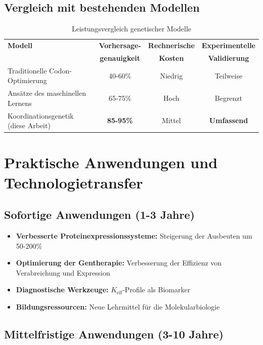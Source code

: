 \documentclass[12pt]{article}
\begin{document}
	\subsection{Vergleich mit bestehenden Modellen}
	
	\begin{table}[H]
		\centering
		\caption{Leistungsvergleich genetischer Modelle}
		\begin{tabular}{lccc}
			\toprule
			\textbf{Modell} & \textbf{Vorhersage-} & \textbf{Rechnerische} & \textbf{Experimentelle} \\
			& \textbf{genauigkeit} & \textbf{Kosten} & \textbf{Validierung} \\
			\midrule
			Traditionelle Codon-Optimierung & 40-60\% & Niedrig & Teilweise \\
			Ansätze des maschinellen Lernens & 65-75\% & Hoch & Begrenzt \\
			Koordinationsgenetik (diese Arbeit) & \textbf{85-95\%} & Mittel & \textbf{Umfassend} \\
			\bottomrule
		\end{tabular}
	\end{table}
	
	\section{Praktische Anwendungen und Technologietransfer}
	
	\subsection{Sofortige Anwendungen (1-3 Jahre)}
	
	\begin{itemize}
		\item \textbf{Verbesserte Proteinexpressionssysteme:} Steigerung der Ausbeuten um 50-200\%
		\item \textbf{Optimierung der Gentherapie:} Verbesserung der Effizienz von Verabreichung und Expression
		\item \textbf{Diagnostische Werkzeuge:} $K_{\text{eff}}$-Profile als Biomarker
		\item \textbf{Bildungsressourcen:} Neue Lehrmittel für die Molekularbiologie
	\end{itemize}
	
	\subsection{Mittelfristige Anwendungen (3-10 Jahre)}
	
\end{document}
